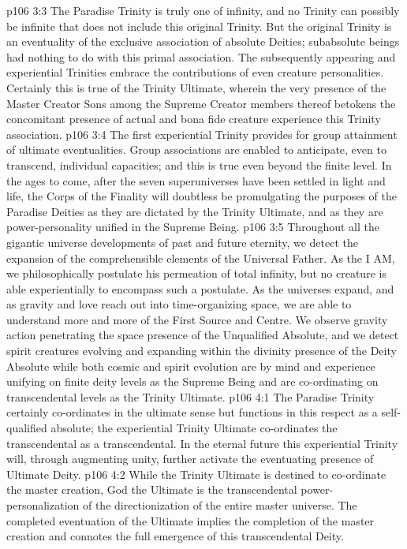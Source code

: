 \vs p106 3:3 The Paradise Trinity is truly one of infinity, and no Trinity can possibly be infinite that does not include this original Trinity. But the original Trinity is an eventuality of the exclusive association of absolute Deities; subabsolute beings had nothing to do with this primal association. The subsequently appearing and experiential Trinities embrace the contributions of even creature personalities. Certainly this is true of the Trinity Ultimate, wherein the very presence of the Master Creator Sons among the Supreme Creator members thereof betokens the concomitant presence of actual and bona fide creature experience  this Trinity association.
\vs p106 3:4 The first experiential Trinity provides for group attainment of ultimate eventualities. Group associations are enabled to anticipate, even to transcend, individual capacities; and this is true even beyond the finite level. In the ages to come, after the seven superuniverses have been settled in light and life, the Corps of the Finality will doubtless be promulgating the purposes of the Paradise Deities as they are dictated by the Trinity Ultimate, and as they are power\hyp{}personality unified in the Supreme Being.
\vs p106 3:5 \pc Throughout all the gigantic universe developments of past and future eternity, we detect the expansion of the comprehensible elements of the Universal Father. As the I AM, we philosophically postulate his permeation of total infinity, but no creature is able experientially to encompass such a postulate. As the universes expand, and as gravity and love reach out into time\hyp{}organizing space, we are able to understand more and more of the First Source and Centre. We observe gravity action penetrating the space presence of the Unqualified Absolute, and we detect spirit creatures evolving and expanding within the divinity presence of the Deity Absolute while both cosmic and spirit evolution are by mind and experience unifying on finite deity levels as the Supreme Being and are co\hyp{}ordinating on transcendental levels as the Trinity Ultimate.
\vs p106 4:1 The Paradise Trinity certainly co\hyp{}ordinates in the ultimate sense but functions in this respect as a self\hyp{}qualified absolute; the experiential Trinity Ultimate co\hyp{}ordinates the transcendental as a transcendental. In the eternal future this experiential Trinity will, through augmenting unity, further activate the eventuating presence of Ultimate Deity.
\vs p106 4:2 While the Trinity Ultimate is destined to co\hyp{}ordinate the master creation, God the Ultimate is the transcendental power\hyp{}personalization of the directionization of the entire master universe. The completed eventuation of the Ultimate implies the completion of the master creation and connotes the full emergence of this transcendental Deity.
